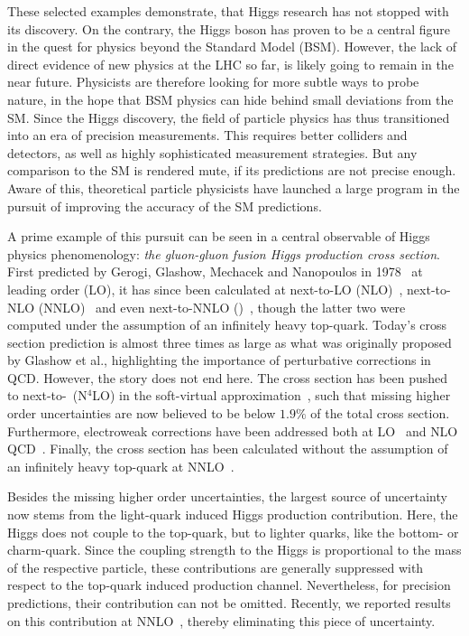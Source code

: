 These selected examples demonstrate, that Higgs research has not stopped with its discovery. On the contrary, the Higgs boson has proven to be a central figure in the quest for physics beyond the Standard Model (\acs{BSM}). However, the lack of direct evidence of new physics at the \acs{LHC} so far, is likely going to remain in the near future. Physicists are therefore looking for more subtle ways to probe nature, in the hope that \acs{BSM} physics can hide behind small deviations from the \acs{SM}. Since the Higgs discovery, the field of particle physics has thus transitioned into an era of precision measurements. This requires better colliders and detectors, as well as highly sophisticated measurement strategies. But any comparison to the \acs{SM} is rendered mute, if its predictions are not precise enough. Aware of this, theoretical particle physicists have launched a large program in the pursuit of improving the accuracy of the \acs{SM} predictions.

A prime example of this pursuit can be seen in a central observable of Higgs physics phenomenology: \textit{the gluon-gluon fusion Higgs production cross section}. First predicted by Gerogi, Glashow, Mechacek and Nanopoulos in 1978~\cite{Georgi:1977gs} at leading order (\acs{LO}), it has since been calculated at next-to-\acs{LO} (\acs{NLO})~\cite{Dawson:1990zj,Djouadi:1991tka}, next-to-\acs{NLO} (\acs{NNLO})~\cite{Catani:2001ic, Harlander:2002wh,Anastasiou:2002yz} and even next-to-\acs{NNLO} (\NNNLO)~\cite{Anastasiou:2015vya,Mistlberger:2018etf}, though the latter two were computed under the assumption of an infinitely heavy top-quark. Today's cross section prediction is almost three times as large as what was originally proposed by Glashow et al., highlighting the importance of perturbative corrections in \acs{QCD}. However, the story does not end here. The cross section has been pushed to next-to-\NNNLO\ (N${}^4$LO) in the soft-virtual approximation~\cite{Das:2020adl}, such that missing higher order uncertainties are now believed to be below $1.9\%$ of the total cross section. Furthermore, electroweak corrections have been addressed both at \acs{LO}~\cite{Aglietti:2004nj,Degrassi:2004mx} and \acs{NLO} \acs{QCD}~\cite{Actis:2008ts, Actis:2008ug,Anastasiou:2008tj,Anastasiou:2018adr,Bonetti:2018ukf,Becchetti:2020wof}. Finally, the cross section has been calculated without the assumption of an infinitely heavy top-quark at \acs{NNLO}~\cite{Czakon:2021yub}.

Besides the missing higher order uncertainties, the largest source of uncertainty now stems from the light-quark induced Higgs production contribution. Here, the Higgs does not couple to the top-quark, but to lighter quarks, like the bottom- or charm-quark. Since the coupling strength to the Higgs is proportional to the mass of the respective particle, these contributions are generally suppressed with respect to the top-quark induced production channel. Nevertheless, for precision predictions, their contribution can not be omitted. Recently, we reported results on this contribution at \acs{NNLO}~\cite{Czakon:2023kqm, Czakon:2024ywb}, thereby eliminating this piece of uncertainty.

